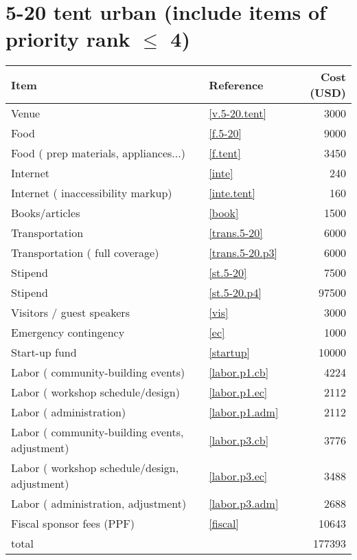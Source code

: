 \section*{5-20 tent urban (include items of priority rank $\leq$ 4)}
\begin{center}
\begin{tabular}{llr}
Item & Reference & Cost (USD) \\ \hline
Venue & \ref{v.5-20.tent} & 3000 \\
Food & \ref{f.5-20} & 9000 \\
Food ( prep materials, appliances...) & \ref{f.tent} & 3450 \\
Internet & \ref{inte} & 240 \\
Internet ( inaccessibility markup) & \ref{inte.tent} & 160 \\
Books/articles & \ref{book} & 1500 \\
Transportation & \ref{trans.5-20} & 6000 \\
Transportation ( full coverage) & \ref{trans.5-20.p3} & 6000 \\
Stipend & \ref{st.5-20} & 7500 \\
Stipend & \ref{st.5-20.p4} & 97500 \\
Visitors / guest speakers & \ref{vis} & 3000 \\
Emergency contingency & \ref{ec} & 1000 \\
Start-up fund & \ref{startup} & 10000 \\
Labor ( community-building events) & \ref{labor.p1.cb} & 4224 \\
Labor ( workshop schedule/design) & \ref{labor.p1.ec} & 2112 \\
Labor ( administration) & \ref{labor.p1.adm} & 2112 \\
Labor ( community-building events, adjustment) & \ref{labor.p3.cb} & 3776 \\
Labor ( workshop schedule/design, adjustment) & \ref{labor.p3.ec} & 3488 \\
Labor ( administration, adjustment) & \ref{labor.p3.adm} & 2688 \\
Fiscal sponsor fees (PPF) & \ref{fiscal} & 10643 \\ \hline
total &  & 177393
\end{tabular}
\end{center}
\newpage
